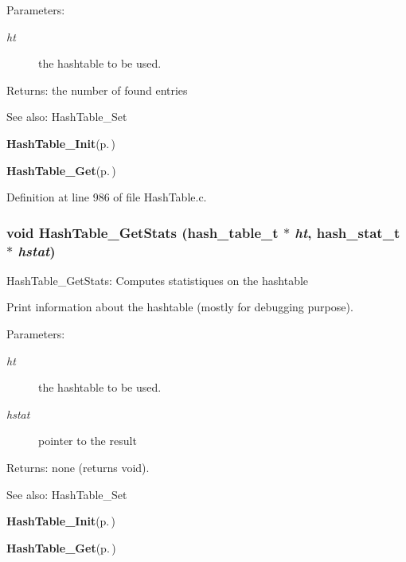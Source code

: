 \begin{Desc}
\item[Parameters:]
\begin{description}
\item[{\em ht}]the hashtable to be used.\end{description}
\end{Desc}
\begin{Desc}
\item[Returns:]the number of found entries\end{Desc}
\begin{Desc}
\item[See also:]Hash\-Table\_\-Set 

{\bf Hash\-Table\_\-Init}{\rm (p.\,\pageref{group__HashTableExportedFunctions_ga0})} 

{\bf Hash\-Table\_\-Get}{\rm (p.\,\pageref{group__HashTableExportedFunctions_ga2})} \end{Desc}


Definition at line 986 of file Hash\-Table.c.
\subsubsection{\setlength{\rightskip}{0pt plus 5cm}void Hash\-Table\_\-Get\-Stats (hash\_\-table\_\-t $\ast$ {\em ht}, hash\_\-stat\_\-t $\ast$ {\em hstat})}\label{group__HashTableExportedFunctions_ga4}


Hash\-Table\_\-Get\-Stats: Computes statistiques on the hashtable

Print information about the hashtable (mostly for debugging purpose).

\begin{Desc}
\item[Parameters:]
\begin{description}
\item[{\em ht}]the hashtable to be used. \item[{\em hstat}]pointer to the result\end{description}
\end{Desc}
\begin{Desc}
\item[Returns:]none (returns void).\end{Desc}
\begin{Desc}
\item[See also:]Hash\-Table\_\-Set 

{\bf Hash\-Table\_\-Init}{\rm (p.\,\pageref{group__HashTableExportedFunctions_ga0})} 

{\bf Hash\-Table\_\-Get}{\rm (p.\,\pageref{group__HashTableExportedFunctions_ga2})} \end{Desc}


